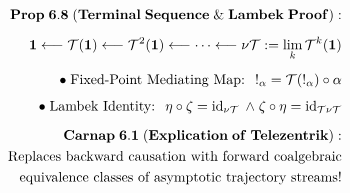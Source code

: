 \documentclass[preview]{standalone}
\begin{document}
\begin{align*}
\special{dvisvgm:raw <g id='unique000'>}\mathbf{Prop\;6.8\;(Terminal\;Sequence\;\&\;Lambek\;Proof):}\\[5pt]\mathbf{1} \longleftarrow \mathcal{T}(\mathbf{1}) \longleftarrow \mathcal{T}^2(\mathbf{1}) \longleftarrow \cdots \longleftarrow \nu\mathcal{T} := \lim_{k} \mathcal{T}^k(\mathbf{1})\\[5pt]\bullet\;\text{Fixed-Point Mediating Map: }\; !_\alpha = \mathcal{T}(!_\alpha) \circ \alpha\\[4pt]\bullet\;\text{Lambek Identity: }\; \eta\circ\zeta = \operatorname{id}_{\nu\mathcal{T}} \;\wedge\; \zeta\circ\eta = \operatorname{id}_{\mathcal{T}\nu\mathcal{T}}\\[6pt]\mathbf{Carnap\;6.1\;(Explication\;of\;Telezentrik):}\\\text{Replaces backward causation with forward coalgebraic}\\\text{equivalence classes of asymptotic trajectory streams!}\special{dvisvgm:raw </g>}
\end{align*}
\end{document}

